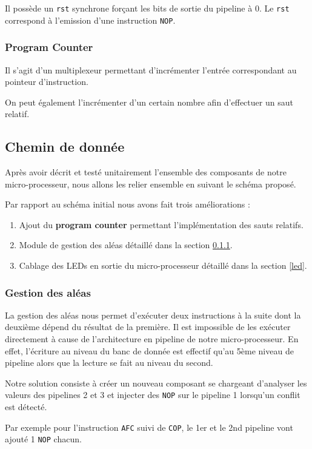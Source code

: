 Il possède un \texttt{rst} synchrone forçant les bits de sortie du pipeline à 0. Le \texttt{rst} correspond à l'emission d'une instruction \texttt{NOP}.

\subsubsection{Program Counter}
Il s'agit d'un multiplexeur permettant d'incrémenter l'entrée correspondant au pointeur d'instruction. 

On peut également l'incrémenter d'un certain nombre afin d'effectuer un saut relatif. 

\subsection{Chemin de donnée}
Après avoir décrit et testé unitairement l'ensemble des composants de notre micro-processeur, nous allons les relier ensemble en suivant le schéma proposé.

Par rapport au schéma initial nous avons fait trois améliorations : 
\begin{enumerate}
\item Ajout du \textbf{program counter} permettant l'implémentation des sauts relatifs.
\item Module de gestion des aléas détaillé dans la section \ref{aleas}.
\item Cablage des LEDs en sortie du micro-processeur détaillé dans la section \ref{led}.
\end{enumerate}

\subsubsection{Gestion des aléas}\label{aleas}
La gestion des aléas nous permet d'exécuter deux instructions à la suite dont la deuxième dépend du résultat de la première. Il est impossible de les exécuter directement à cause de l'architecture en pipeline de notre micro-processeur. En effet, l'écriture au niveau du banc de donnée est effectif qu'au 5ème niveau de pipeline alors que la lecture se fait au niveau du second.

Notre solution consiste à créer un nouveau composant se chargeant d'analyser les valeurs des pipelines 2 et 3 et injecter des \texttt{NOP} sur le pipeline 1 lorsqu'un conflit est détecté. 

Par exemple pour l'instruction \texttt{AFC} suivi de \texttt{COP}, le 1er et le 2nd pipeline vont ajouté 1 \texttt{NOP} chacun. 


